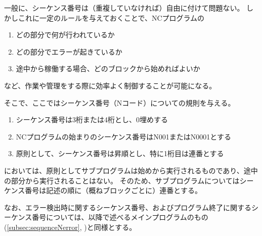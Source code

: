 

一般に、シーケンス番号は（重複していなければ）自由に付けて問題ない。
しかしこれに一定のルールを与えておくことで、NCプログラムの
\begin{enumerate}[label=\sarrow]
\item どの部分で何が行われているか
\item どの部分でエラーが起きているか
\item 途中から稼働する場合、どのブロックから始めればよいか
\end{enumerate}
など、作業や管理をする際に効率よく制御することが可能になる。

そこで、ここではシーケンス番号（Nコード）についての規則を与える。



\begin{enumerate}[label=\Roman*), ref=\Roman*)]
\item {}シーケンス番号は3桁または4桁とし、0埋めする
\item {}NCプログラムの始まりのシーケンス番号は{\ttfamily N001}または{\ttfamily N0001}とする
\item 原則として、シーケンス番号は昇順とし、特に1桁目は連番とする
\end{enumerate}


\DMC においては、原則としてサブプログラムは始めから実行されるものであり、途中の部分から実行されることはない。
そのため、サブプログラムについてはシーケンス番号は記述の順に（概ねブロックごとに）連番とする。

なお、エラー検出時に関するシーケンス番号、およびプログラム終了に関するシーケンス番号については、以降で述べるメインプログラムのもの(\autoref{subsec:sequenceNerror}, )と同様とする。




